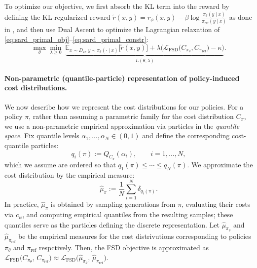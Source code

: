 To optimize our objective, we first absorb the KL term into the reward by defining the KL-regularized reward
$\tilde r(x,y)= r_\phi(x,y)-\beta\log \frac{\pi_\theta(y\mid x)}{\pi_{\mathrm{ref}}(y\mid x)}$ as done in \cite{dai2023safe},
and then use Dual Ascent \citep{gallier2019fundamentals} to optimize the Lagrangian relaxation of \eqref{eq:sard_primal_obj}--\eqref{eq:sard_primal_constr}:
\begin{equation}
  \max_\theta\min_{\lambda\ge 0}\;\underbrace{
    \mathbb{E}_{x\sim D_x,\,y\sim\pi_\theta(\cdot\mid x)}\!\Big[\tilde r(x,y)\Big]
  +\lambda\Big(\mathcal{L}_{\mathrm{FSD}}\!\big(C_{\pi_\theta},C_{\pi_{\mathrm{ref}}}\big)-\kappa\Big)}_{L(\theta,\lambda)}. \label{eq:sard_dual}
\end{equation}

\paragraph{Non-parametric (quantile-particle) representation of policy-induced cost distributions.}
\label{subsec:nonparam}
We now describe how we represent the cost distributions for our policies.
For a policy $\pi$, rather than assuming a parametric family for the cost distribution $C_\pi$, we use a non-parametric empirical approximation
via particles in the \emph{quantile space}. Fix quantile levels $\alpha_1,\dots,\alpha_N\in(0,1)$ and define the corresponding
cost-quantile particles:
\begin{equation}
  q_i(\pi) := Q_{C_\pi}(\alpha_i),\qquad i=1,\dots,N,
  \label{eq:quantile_particles}
\end{equation}
which we assume are ordered so that $q_1(\pi)\le \cdots \le q_N(\pi)$.
We approximate the cost distribution by the empirical measure:
\begin{equation}
  \hat\mu_\pi := \frac{1}{N}\sum_{i=1}^N \delta_{q_i(\pi)}.
  \label{eq:empirical_measure}
\end{equation}
In practice, $\hat\mu_\pi$ is obtained by sampling generations from $\pi$, evaluating their costs via $c_\psi$,
and computing empirical quantiles from the resulting samples; these quantiles serve as the particles defining the discrete
representation. Let $\hat{\mu}_{\pi_{\theta}}$ and $\hat{\mu}_{\pi_{\mathrm{ref}}}$ be the empirical measures for the cost distrivutions corresponding to policies $\pi_{\theta}$ and $\pi_{\mathrm{ref}}$ respctively. Then, the FSD objective is approximated as $\mathcal{L}_{\mathrm{FSD}}\!\big(C_{\pi_\theta},\,C_{\pi_{\mathrm{ref}}}\big) \approx \mathcal{L}_{\mathrm{FSD}}\!\big(\hat{\mu}_{\pi_{\theta}},\,\hat{\mu}_{\pi_{\mathrm{ref}}}\big)$. %
